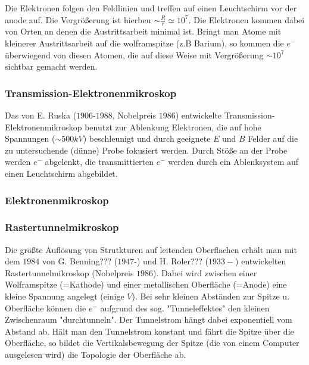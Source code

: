     Die Elektronen folgen den Feldlinien und treffen auf einen Leuchtschirm vor
    der anode auf. Die Vergrößerung ist hierbeu $\sim \frac{R}{r} \simeq 10^7$.
    Die Elektronen kommen dabei von Orten an denen die Austrittsarbeit minimal
    ist. Bringt man Atome mit kleinerer Austrittsarbeit auf die wolframspitze
    (z.B Barium), so kommen die $e^-$ überwiegend von diesen Atomen, die auf
    diese Weise mit Vergrößerung $\sim 10^7$ sichtbar gemacht werden.
\subsubsection{Transmission-Elektronenmikroskop} %
\label{ssub:Transmission-Elektronenmikroskop}
    Das von E. Ruska ($1906$-$1988$, Nobelpreis $1986$) entwickelte
    Transmission-Elektronenmikroskop benutzt zur Ablenkung Elektronen, die auf hohe
    Spannungen ($\sim 500kV$) beschleunigt und durch geeignete $E$ und $B$
    Felder auf die  zu untersuchende (dünne) Probe fokusiert werden. Durch
    Stöße an der Probe werden $e^-$ abgelenkt, die transmittierten $e^-$ werden
    durch ein Ablenksystem auf einen Leuchtschirm abgebildet.
\subsubsection{Elektronenmikroskop} %
\label{ssub:Elektronenmikroskop}
\subsubsection{Rastertunnelmikroskop} %
\label{ssub:Rastertunnelmikroskop}
    Die größte Auflösung von Strutkturen auf leitenden Oberflachen erhält man
    mit dem $1984$ von G. Benning??? ($1947$-) und H. Roler??? ($1933-$)
    entwickelten Rastertunnelmikroskop (Nobelpreis $1986$). Dabei wird zwischen
    einer Wolframspitze (=Kathode) und einer metallischen Oberfläche (=Anode)
    eine kleine Spannung angelegt (einige $V$). Bei sehr kleinen Abständen zur
    Spitze u. Oberfläche können die $e^-$ aufgrund des sog. "Tunneleffektes"
    den kleinen Zwischenraum "durchtunneln". Der Tunnelstrom hängt dabei
    exponentiell vom Abstand ab. Hält man den Tunnelstrom konstant und fährt
    die Spitze über die Oberfläche, so bildet die Vertikalsbewegung der Spitze
    (die von einem Computer ausgelesen wird) die Topologie der Oberfläche ab.
